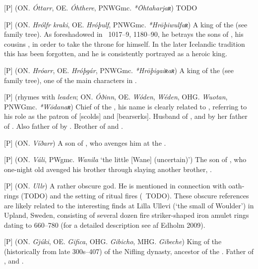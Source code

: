 \begin{itemize}
[P] (ON. \emph{Óttarr}, OE. \emph{Óhthere}, PNWGmc. \emph{*Ōhtaharjaʀ})
  TODO

[P] (ON. \emph{Hrólfr kraki}, OE. \emph{Hróþulf}, PNWGmc. \emph{*Hrōþiwulfaʀ})
  A king of the  (see family tree). As foreshadowed in \Beowulf\ 1017–9, 1180–90, he betrays the sons of , his cousins , in order to take the throne for himself. In the later Icelandic tradition this has been forgotten, and he is consistently portrayed as a heroic king.

[P] (ON. \emph{Hróarr}, OE. \emph{Hróþgár}, PNWGmc. \emph{*Hrōþigaiʀaʀ})
  A king of the  (see family tree), one of the main characters in \Beowulf.

[P] (rhymes with \emph{leaden}; ON. \emph{Óðinn}, OE. \emph{Wóden}, \emph{Wéden}, OHG. \emph{Wuotan}, PNWGmc. \emph{*Wōdanaʀ})
  Chief of the , his name is clearly related to , referring to his role as the patron of [scolds] and [bearserks]. Husband of , and by her father of . Also father of  by . Brother of  and .

[P] (ON. \emph{Víðarr})
  A son of , who avenges him at the .

[P] (ON. \emph{Váli}, PWgmc. \emph{Wanila} ‘the little [Wane] (uncertain)’)
  The son of , who one-night old avenged his brother  through slaying another brother, .

[P] (ON. \emph{Ullr})
  A rather obscure god. He is mentioned in connection with oath-rings (TODO) and the setting of ritual fires (\Grimnismal\ TODO). These obscure references are likely related to the interesting finds at Lilla Ullevi (‘the small  of Woulder’) in Upland, Sweden, consisting of several dozen fire striker-shaped iron amulet rings dating to 660–780 (for a detailed description see af Edholm 2009).

[P] (ON. \emph{Gjúki}, OE. \emph{Gifica}, OHG. \emph{Gibicho}, MHG. \emph{Gibeche})
  King of the  (historically from late 300s–407) of the Nifling dynasty, ancestor of the . Father of ,  and .

\end{itemize}


